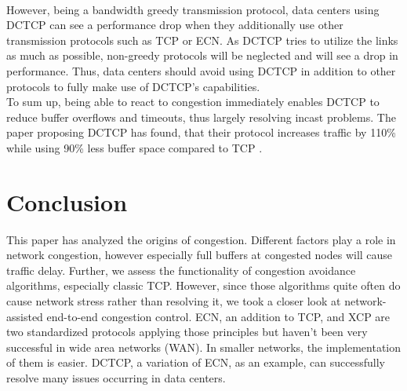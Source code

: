 \documentclass[a4paper,conference]{IEEEtran}
\begin{document}
\\However, being a bandwidth greedy transmission protocol, data centers using DCTCP can see a performance drop when they additionally use other transmission protocols such as TCP or ECN. As DCTCP tries to utilize the links as much as possible, non-greedy protocols will be neglected and will see a drop in performance. Thus, data centers should avoid using DCTCP in addition to other protocols to fully make use of DCTCP's capabilities.
\\To sum up, being able to react to congestion immediately enables DCTCP to reduce buffer overflows and timeouts, thus largely resolving incast problems. The paper proposing DCTCP has found, that their protocol increases traffic by 110\% while using 90\% less buffer space compared to TCP \cite{10.1145/1851275.1851192}.

\section{Conclusion}
This paper has analyzed the origins of congestion. Different factors play a role in network congestion, however especially full buffers at congested nodes will cause traffic delay. Further, we assess the functionality of congestion avoidance algorithms, especially classic TCP. However, since those algorithms quite often do cause network stress rather than resolving it, we took a closer look at network-assisted end-to-end congestion control. ECN, an addition to TCP, and XCP are two standardized protocols applying those principles but haven't been very successful in wide area networks (WAN). In smaller networks, the implementation of them is easier. DCTCP, a variation of ECN, as an example, can successfully resolve many issues occurring in data centers.


\end{document}
